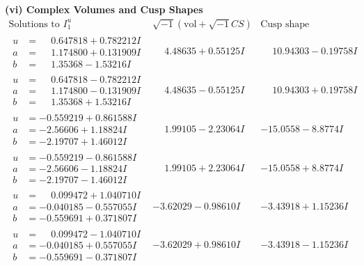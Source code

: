 \documentclass[1p]{elsarticle_modified}
\theoremstyle{definition}
\newcommand{\I}{\sqrt{-1}}
\begin{document}
\newpage\flushleft \textbf{(vi) Complex Volumes and Cusp Shapes}
$$\begin{array}{c|c|c}  
\text{Solutions to }I^u_{1}& \I (\text{vol} + \sqrt{-1}CS) & \text{Cusp shape}\\
 \hline 
\begin{aligned}
u &= \phantom{-}0.647818 + 0.782212 I \\
a &= \phantom{-}1.174800 + 0.131909 I \\
b &= \phantom{-}1.35368 - 1.53216 I\end{aligned}
 & \phantom{-}4.48635 + 0.55125 I & \phantom{-}10.94303 - 0.19758 I \\ \hline\begin{aligned}
u &= \phantom{-}0.647818 - 0.782212 I \\
a &= \phantom{-}1.174800 - 0.131909 I \\
b &= \phantom{-}1.35368 + 1.53216 I\end{aligned}
 & \phantom{-}4.48635 - 0.55125 I & \phantom{-}10.94303 + 0.19758 I \\ \hline\begin{aligned}
u &= -0.559219 + 0.861588 I \\
a &= -2.56606 + 1.18824 I \\
b &= -2.19707 + 1.46012 I\end{aligned}
 & \phantom{-}1.99105 - 2.23064 I & -15.0558 - 8.8774 I \\ \hline\begin{aligned}
u &= -0.559219 - 0.861588 I \\
a &= -2.56606 - 1.18824 I \\
b &= -2.19707 - 1.46012 I\end{aligned}
 & \phantom{-}1.99105 + 2.23064 I & -15.0558 + 8.8774 I \\ \hline\begin{aligned}
u &= \phantom{-}0.099472 + 1.040710 I \\
a &= -0.040185 - 0.557055 I \\
b &= -0.559691 + 0.371807 I\end{aligned}
 & -3.62029 - 0.98610 I & -3.43918 + 1.15236 I \\ \hline\begin{aligned}
u &= \phantom{-}0.099472 - 1.040710 I \\
a &= -0.040185 + 0.557055 I \\
b &= -0.559691 - 0.371807 I\end{aligned}
 & -3.62029 + 0.98610 I & -3.43918 - 1.15236 I \\ \hline\begin{aligned}

\end{aligned}
\end{array}$$
\end{document}
